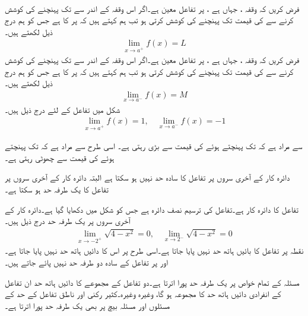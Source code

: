 \\
فرض کریں کہ وقفہ ، جہاں  ہے ، پر تفاعل  معین ہے۔اگر  اس وقفہ کے اندر سے  تک  پہنچنے کی کوشش کرنے سے  کی قیمت  تک پہنچنے کی کوشش کرتی ہو تب ہم کہتے ہیں کہ  پر  کا   ہے جس کو ہم درج ذیل لکھتے ہیں۔
\begin{align*}
\lim\limits_{x\to a^+} f(x)=L
\end{align*}
فرض کریں کہ وقفہ ، جہاں  ہے ، پر تفاعل  معین ہے۔اگر  اس وقفہ کے اندر سے  تک  پہنچنے کی کوشش کرنے سے  کی قیمت  تک پہنچنے کی کوشش کرتی ہو تب ہم کہتے ہیں کہ  پر  کا   ہے جس کو ہم درج ذیل لکھتے ہیں۔
\begin{align*}
\lim\limits_{x\to a^-} f(x)=M
\end{align*}
شکل  میں تفاعل  کے لئے درج ذیل ہیں۔
\begin{align*}
\lim\limits_{x\to a^+} f(x)=1,\quad \lim\limits_{x\to a^-} f(x)=-1
\end{align*}

 سے مراد ہے کہ   تک پہنچتے ہوئے  کی قیمت  سے بڑی رہتی ہے۔ اسی طرح  سے مراد ہے کہ   تک پہنچتے ہوئے  کی قیمت  سے چھوٹی رہتی ہے۔ 

دائرہ کار کے آخری سروں پر تفاعل کا سادہ حد نہیں ہو سکتا ہے البتہ دائرہ کار کے آخری سروں پر تفاعل کا یک طرفہ حد  ہو سکتا ہے۔

تفاعل  کا دائرہ کار  ہے۔تفاعل کی ترسیم نصف دائرہ ہے جس کو شکل  میں دکھایا گیا ہے۔دائرہ کار کے آخری سروں پر یک طرفہ حد درج ذیل ہیں۔
\begin{align*}
\lim\limits_{x\to -2^+} \sqrt{4-x^2}=0,\quad  \lim\limits_{x\to 2^-} \sqrt{4-x^2}=0
\end{align*}
نقطہ  پر تفاعل کا بائیں ہاتھ حد نہیں پایا جاتا ہے۔اسی طرح  پر اس کا دائیں ہاتھ حد نہیں پایا جاتا ہے۔ اور  پر تفاعل کے سادہ دو طرفہ حد نہیں پائے جاتے ہیں۔

مسئلہ  کے تمام خواص پر یک طرفہ حد پورا اترتا ہے۔دو تفاعل کے مجموعے کا دائیں ہاتھ حد  ان تفاعل  کے انفرادی دائیں ہاتھ حد کا مجموعہ ہو گا، وغیرہ وغیرہ۔کثیر رکنی اور ناطق تفاعل کے حد کے مسئلوں اور مسئلہ بیچ  پر بھی یک طرفہ حد پورا اترتا ہے۔  

